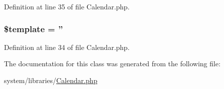 Definition at line 35 of file Calendar.\-php.

\hypertarget{class_c_i___calendar_aa3e9534005fd516d941f6a5569896e01}{
\subsubsection[{\$template}]{\setlength{\rightskip}{0pt plus 5cm}\$template = ''}}\label{class_c_i___calendar_aa3e9534005fd516d941f6a5569896e01}


Definition at line 34 of file Calendar.\-php.



The documentation for this class was generated from the following file\-:\begin{DoxyCompactItemize}
\item 
system/libraries/\hyperlink{_calendar_8php}{Calendar.\-php}\end{DoxyCompactItemize}
